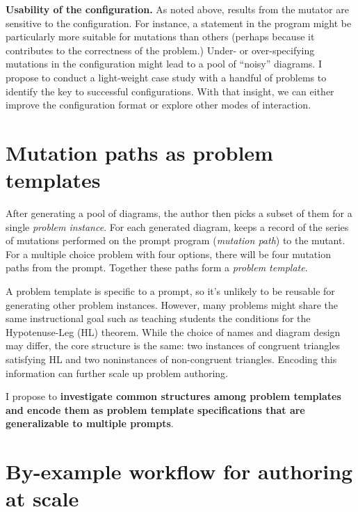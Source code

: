 \begin{proposed}
\label{prop:config-usability}
\textbf{Usability of the \Edgeworth configuration.} As noted above, results from the \Edgeworth mutator are sensitive to the configuration. For instance, a statement in the \Substance program might be particularly more suitable for mutations than others (perhaps because it contributes to the correctness of the problem.) Under- or over-specifying mutations in the configuration might lead to a pool of ``noisy'' diagrams. I propose to conduct a light-weight case study with a handful of problems to identify the key to successful configurations. With that insight, we can either improve the configuration format or explore other modes of interaction.
\end{proposed}

\section{Mutation paths as problem templates}
\label{sec:mutation-paths}

\begin{proposed}
After generating a pool of diagrams, the author then picks a subset of them for a single \emph{problem instance}. For each generated diagram, \Edgeworth keeps a record of the series of mutations performed on the prompt program (\emph{mutation path}) to the mutant. For a multiple choice problem with four options, there will be four mutation paths from the prompt. Together these paths form a \emph{problem template}.

A problem template is specific to a prompt, so it's unlikely to be reusable for generating other problem instances. However, many problems might share the same instructional goal such as teaching students the conditions for the Hypotenuse-Leg (HL) theorem. While the choice of names and diagram design may differ, the core structure is the same: two instances of congruent triangles satisfying HL and two noninstances of non-congruent triangles. Encoding this information can further scale up problem authoring. 

I propose to \textbf{investigate common structures among problem templates and encode them as problem template specifications that are generalizable to multiple prompts}. 

\end{proposed}

\section{By-example workflow for authoring at scale}
\label{sec:edgeworth-by-example}

